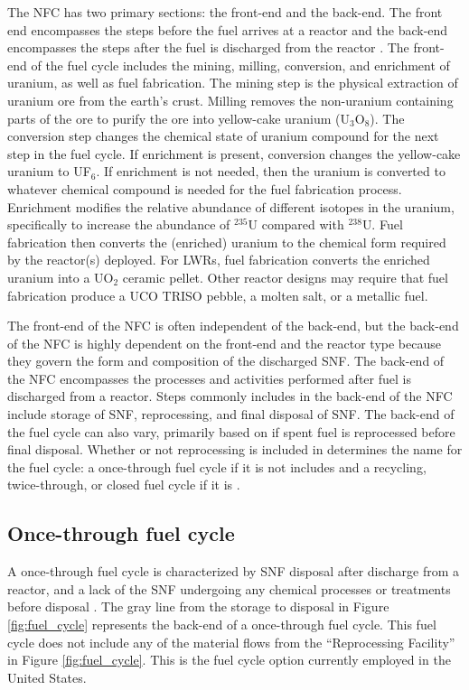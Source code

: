The \acrfull{NFC} has two primary sections: the front-end and 
the back-end. 
The front end encompasses the steps before the fuel arrives at a reactor 
and the back-end encompasses the steps after the fuel is discharged 
from the reactor \cite{rodriguez-penalonga_review_2017}. The 
front-end of the fuel cycle includes the mining, 
milling, conversion, and enrichment of uranium, as well as 
fuel fabrication. The mining step is the physical extraction of uranium 
ore from the earth's crust. Milling removes the non-uranium containing 
parts of the ore to purify the ore into yellow-cake uranium (U$_3$O$_8$).
The conversion step changes the chemical state of uranium compound 
for the next step in the fuel cycle. If enrichment is present, conversion 
changes the yellow-cake uranium to UF$_6$. If enrichment is not 
needed, then the uranium is converted to whatever chemical compound is 
needed for the fuel fabrication process. Enrichment modifies the 
relative abundance of different isotopes in the uranium, specifically 
to increase the abundance of $^{235}$U compared with $^{238}$U. Fuel 
fabrication then converts the (enriched) uranium to the chemical 
form required by the reactor(s) deployed. For \glspl{LWR}, fuel 
fabrication converts the enriched uranium into a UO$_2$ ceramic 
pellet. Other reactor designs may require that fuel fabrication 
produce a UCO \gls{TRISO} pebble, a molten salt, or a metallic fuel. 

The front-end of 
the \gls{NFC} is often independent of the back-end, but the back-end 
of the \gls{NFC} is highly dependent on the front-end and the reactor 
type because they govern the form and composition of the discharged 
\acrfull{SNF}. The back-end of the \gls{NFC} encompasses the 
processes and activities performed after fuel is discharged from 
a reactor. Steps commonly includes in the back-end of the \gls{NFC} 
include storage of \gls{SNF}, reprocessing, and final disposal of 
\gls{SNF}. 
The back-end of the fuel cycle can also vary, primarily based on if spent 
fuel is reprocessed before final disposal. Whether or not reprocessing is 
included in determines the name for the fuel cycle: a once-through
fuel cycle if it is not includes and a recycling, twice-through, 
or closed fuel cycle if it is \cite{tsoulfanidis_nuclear_2013}. 

\subsection{Once-through fuel cycle}
A once-through fuel cycle is characterized by \gls{SNF} disposal
after discharge from a reactor, and a lack of the 
\gls{SNF} undergoing any chemical processes 
or treatments before disposal \cite{rodriguez-penalonga_review_2017}. 
The gray line from 
the storage to disposal in Figure \ref{fig:fuel_cycle} represents 
the back-end of a once-through fuel cycle. This fuel cycle does 
not include any of the material flows from the ``Reprocessing Facility'' 
in Figure \ref{fig:fuel_cycle}.
This is the fuel cycle option currently employed in the 
United States. 

